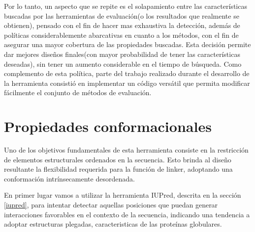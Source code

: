 Por lo tanto, un aspecto que se repite es el solapamiento entre las características buscadas por las herramientas de evaluación(o los resultados que realmente se obtienen), pensado con el fin de hacer mas exhaustiva la detección,
además de políticas considerablemente abarcativas en cuanto a los métodos, con el fin de asegurar una mayor cobertura de las propiedades buscadas.
Esta decisión permite dar mejores diseños finales(con mayor probabilidad de tener las características deseadas), sin tener un aumento considerable en el tiempo de búsqueda.
Como complemento de esta política, parte del trabajo realizado durante el desarrollo de la herramienta consistió en implementar un código versátil que permita modificar fácilmente el conjunto de métodos de evaluación.





\section{Propiedades conformacionales} \label{propiedadesConformacionales}

Uno de los objetivos fundamentales de esta herramienta consiste en la restricción de elementos estructurales ordenados en la secuencia. 
Esto brinda al diseño resultante la flexibilidad requerida para la función de linker, adoptando una conformación intrínsecamente desordenada. 

En primer lugar vamos a utilizar la herramienta IUPred, descrita en la sección \ref{iupred}, para intentar detectar aquellas posiciones que puedan generar interacciones 
favorables en el contexto de la secuencia, indicando una tendencia a adoptar estructuras plegadas, caracteristicas de las proteínas globulares.

